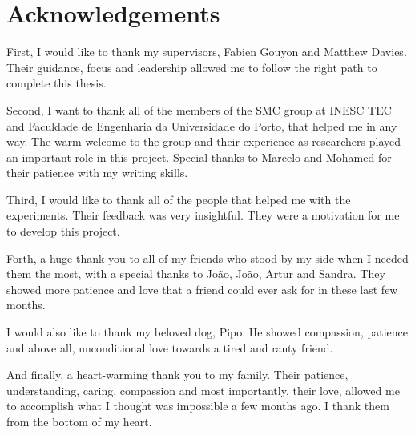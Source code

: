 
\chapter*{Acknowledgements}

First, I would like to thank my supervisors, Fabien Gouyon and Matthew Davies.
Their guidance, focus and leadership allowed me to follow the right path to complete this thesis.

Second, I want to thank all of the members of the SMC group at INESC TEC and Faculdade de Engenharia da Universidade do Porto, that helped me in any way.
The warm welcome to the group and their experience as researchers played an important role in this project.
Special thanks to Marcelo and Mohamed for their patience with my writing skills.

Third, I would like to thank all of the people that helped me with the experiments.
Their feedback was very insightful.
They were a motivation for me to develop this project.

Forth, a huge thank you to all of my friends who stood by my side when I needed them the most, with a special thanks to João, João, Artur and Sandra.
They showed more patience and love that a friend could ever ask for in these last few months.

I would also like to thank my beloved dog, Pipo. He showed compassion, patience and above all, unconditional love towards a tired and ranty friend.

And finally, a heart-warming thank you to my family.
Their patience, understanding, caring, compassion and most importantly, their love, allowed me to accomplish what I thought was impossible a few months ago.
I thank them from the bottom of my heart.


\vspace{10mm}
